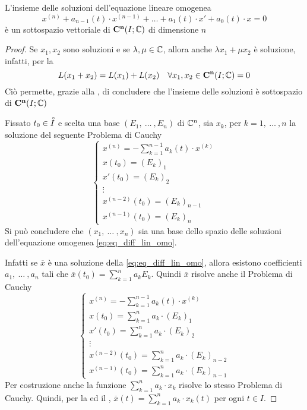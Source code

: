 \begin{proposition}
	L'insieme delle soluzioni dell'equazione lineare omogenea
	\begin{equation}
		\label{eq:eq_diff_lin_omo}
		x^{(n)} + a_{n-1}(t) \cdot x^{(n-1)} + \dotsc + a_1(t) \cdot x' + a_0(t) \cdot x = 0
	\end{equation}
	è un sottospazio vettoriale di $\mathbf{C^{n}}(I;\mathbb{C})$ di dimensione $n$
	\begin{proof}
		Se $x_1, x_2$ sono soluzioni e se $\lambda, \mu \in \mathbb{C}$, allora anche $\lambda x_1 + \mu x_2$ è soluzione, infatti, per la 
		$$L(x_1+x_2) = L(x_1)+L(x_2) \quad\forall x_1,x_2\in \mathbf{C^{n}}(I;\mathbb{C}) = 0$$
		Ciò permette, grazie alla , di concludere che l'insieme delle soluzioni è sottospazio di $\mathbf{C^{n}}(I;\mathbb{C})$

		Fissato $t_0 \in \accentset{\circ}{I}$ e scelta una base $(E_1,\:\dotsc\:,E_n)$ di $\mathbb{C}^n$, sia $x_k$, per $k=1,\:\dotsc\:,n$ la soluzione del seguente Problema di Cauchy
		\begin{equation*}
		\begin{cases}
			x^{(n)} = -\sum_{k=1}^{n-1} a_k(t) \cdot x^{(k)}\\
			x(t_0) = (E_k)_1\\
			x'(t_0) = (E_k)_2\\
			\vdots\\
			x^{(n-2)}(t_0) = (E_k)_{n-1}\\
			x^{(n-1)}(t_0) = (E_k)_{n}
		\end{cases}
		\end{equation*}
		Si può concludere che $(x_1,\:\dotsc\:,x_n)$ sia una base dello spazio delle soluzioni dell'equazione omogenea \cref{eq:eq_diff_lin_omo}.

		Infatti se $\overline{x}$ è una soluzione della \cref{eq:eq_diff_lin_omo}, allora esistono coefficienti $a_1,\:\dotsc\:,a_n$ tali che $\overline{x}(t_0) = \sum\limits_{k=1}^{n}a_k E_k$. Quindi $\overline{x}$ risolve anche il Problema di Cauchy
		\begin{equation*}
		\begin{cases}
			x^{(n)} = -\sum_{k=1}^{n-1} a_k(t) \cdot x^{(k)}\\
			x(t_0) = \sum_{k=1}^{n} a_k \cdot (E_k)_1\\
			x'(t_0) = \sum_{k=1}^{n} a_k \cdot (E_k)_2\\
			\vdots\\
			x^{(n-2)}(t_0) = \sum_{k=1}^{n} a_k \cdot (E_k)_{n-2}\\
			x^{(n-1)}(t_0) = \sum_{k=1}^{n} a_k \cdot (E_k)_{n-1}
		\end{cases}
		\end{equation*}
		Per costruzione anche la funzione $\sum\limits_{k=1}^{n} a_k \cdot x_k$ risolve lo stesso Problema di Cauchy. Quindi, per la  ed il , $\overline{x}(t) = \sum\limits_{k=1}^{n} a_k \cdot x_k(t)$ per ogni $t \in I$.


\end{proof}
\end{proposition}
